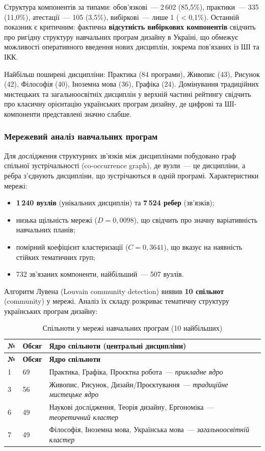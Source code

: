Структура компонентів за типами: обов'язкові~--- 2\,602 (85,5\%), практики~--- 335 (11,0\%), атестації~--- 105 (3,5\%), вибіркові~--- лише 1 ($<$0,1\%). Останній показник є критичним: фактична \textbf{відсутність вибіркових компонентів} свідчить про ригідну структуру навчальних програм дизайну в Україні, що обмежує можливості оперативного введення нових дисциплін, зокрема пов'язаних із ШІ та ІКК.

Найбільш поширені дисципліни: Практика (84 програми), Живопис (43), Рисунок (42), Філософія (40), Іноземна мова (36), Графіка (24). Домінування традиційних мистецьких та загальноосвітніх дисциплін у верхній частині рейтингу свідчить про класичну орієнтацію українських програм дизайну, де цифрові та ШІ-компоненти представлені значно слабше.

\subsubsection{Мережевий аналіз навчальних програм}\label{sssec:2.1.2}

Для дослідження структурних зв'язків між дисциплінами побудовано граф спільної зустрічальності (co-occurrence graph), де вузли~--- це дисципліни, а ребра з'єднують дисципліни, що зустрічаються в одній програмі. Характеристики мережі:

\begin{itemize}
    \item \textbf{1\,240 вузлів} (унікальних дисциплін) та \textbf{7\,524 ребер} (зв'язків);
    \item низька щільність мережі ($D = 0{,}0098$), що свідчить про значну варіативність навчальних планів;
    \item помірний коефіцієнт кластеризації ($C = 0{,}3641$), що вказує на наявність стійких тематичних груп;
    \item 732 зв'язаних компоненти, найбільший~--- 507 вузлів.
\end{itemize}

Алгоритм Лувена (Louvain community detection) виявив \textbf{10 спільнот} (community) у мережі. Аналіз їх складу розкриває тематичну структуру українських програм дизайну:

\begin{longtable}{@{}p{}p{}p{}@{}}
\caption{Спільноти у мережі навчальних програм (10 найбільших)}\label{tab:communities} \\
\hline
\textbf{№} & \textbf{Обсяг} & \textbf{Ядро спільноти (центральні дисципліни)} \\
\hline
\endfirsthead
\hline
\textbf{№} & \textbf{Обсяг} & \textbf{Ядро спільноти} \\
\hline
\endhead
1 & 69 & Практика, Графіка, Проєктна робота~--- \textit{прикладне ядро} \\
3 & 56 & Живопис, Рисунок, Дизайн/Проєктування~--- \textit{традиційне мистецьке ядро} \\
6 & 49 & Наукові дослідження, Теорія дизайну, Ергономіка~--- \textit{теоретичний кластер} \\
7 & 49 & Філософія, Іноземна мова, Українська мова~--- \textit{загальноосвітній кластер} \\
\hline
\end{longtable}

